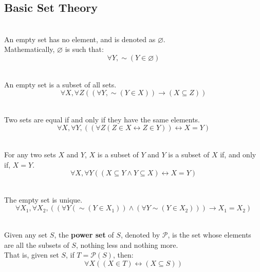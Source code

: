\documentclass[12pt]{article}
\begin{document}
\subsection{Basic Set Theory}
\begin{definition}
\hfill\\
\normalfont An empty set has no element, and is denoted as $\varnothing$.\\
Mathematically, $\varnothing$ is such that:
\[
\forall Y, \sim(Y\in\varnothing)
\]
\end{definition}
\begin{theorem}[6.2.4(Epp)]
\hfill\\
\normalfont An empty set is a subset of all sets.
\[
\forall X, \forall Z ((\forall Y, \sim(Y\in X))\to(X\subseteq Z))
\]
\end{theorem}
\begin{definition}
\hfill\\
\normalfont Two sets are equal if and only if they have the same elements.
\[
\forall X, \forall Y, ((\forall Z(Z\in X\leftrightarrow Z\in Y))\leftrightarrow X=Y)
\]
\end{definition}
\begin{proposition}[6.3.3]
\hfill\\
\normalfont For any two sets $X$ and $Y$, $X$ is a subset of $Y$ and $Y$ is a subset of $X$ if, and only if, $X=Y$.
\[
\forall X, \forall Y((X\subseteq Y\land Y\subseteq X)\leftrightarrow X=Y)
\]
\end{proposition}
\begin{corollary}[6.2.5(Epp)]
\hfill\\
\normalfont The empty set is unique.
\[
\forall X_1,\forall X_2,((\forall Y(\sim(Y\in X_1))\land(\forall Y\sim(Y\in X_2)))\rightarrow X_1=X_2)
\]
\end{corollary}
\begin{definition}[6.3.4]
\hfill\\
\normalfont Given any set $S$, the \textbf{power set} of $S$, denoted by $\mathcal{P}$, is the set whose elements are all the subsets of $S$, nothing less and nothing more.\\
That is, given set $S$, if $T=\mathcal{P}(S)$, then:
\[
\forall X((X\in T)\leftrightarrow(X\subseteq S))
\]
\end{definition}
\end{document}
